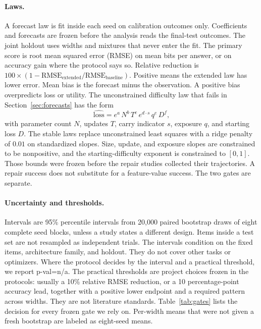\paragraph{Laws.}
A forecast law is fit inside each seed on calibration outcomes only.
Coefficients and forecasts are frozen before the analysis reads the final-test outcomes.
The joint holdout uses widths and mixtures that never enter the fit.
The primary score is root mean squared error (RMSE) on mean bits per answer, or on accuracy gain where the protocol says so.
Relative reduction is $100 \times (1 - \mathrm{RMSE}_{\mathrm{extended}} / \mathrm{RMSE}_{\mathrm{baseline}})$.
Positive means the extended law has lower error.
Mean bias is the forecast minus the observation.
A positive bias overpredicts loss or utility.
The unconstrained difficulty law that fails in Section~\ref{sec:forecasts} has the form
\begin{equation}
\label{eq:legacy}
\widehat{\mathrm{loss}}
= e^{a}\, N^{b}\, T^{c}\, e^{d \cdot s}\, q^{e}\, D^{f},
\end{equation}
with parameter count $N$, updates $T$, carry indicator $s$, exposure $q$, and starting loss $D$.
The stable laws replace unconstrained least squares with a ridge penalty of $0.01$ on standardized slopes.
Size, update, and exposure slopes are constrained to be nonpositive, and the starting-difficulty exponent is constrained to $[0,1]$.
Those bounds were frozen before the repair studies collected their trajectories.
A repair success does not substitute for a feature-value success.
The two gates are separate.

\paragraph{Uncertainty and thresholds.}
Intervals are 95\% percentile intervals from 20{,}000 paired bootstrap draws of eight complete seed blocks, unless a study states a different design.
Items inside a test set are not resampled as independent trials.
The intervals condition on the fixed items, architecture family, and holdout.
They do not cover other tasks or optimizers.
Where the protocol decides by the interval and a practical threshold, we report p-val=n/a.
The practical thresholds are project choices frozen in the protocols: usually a 10\% relative RMSE reduction, or a 10 percentage-point accuracy lead, together with a positive lower endpoint and a required pattern across widths.
They are not literature standards.
Table~\ref{tab:gates} lists the decision for every frozen gate we rely on.
Per-width means that were not given a fresh bootstrap are labeled as eight-seed means.

